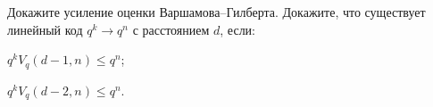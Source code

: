 Докажите усиление оценки Варшамова--Гилберта. Докажите, что существует линейный код $q^k \to q^n$ с
расстоянием $d$, если:
\begin{enumcyr}
    \item $q^k V_q(d - 1, n) \le q^n$;
    \item $q^k V_q(d - 2, n) \le q^n$.
\end{enumcyr}